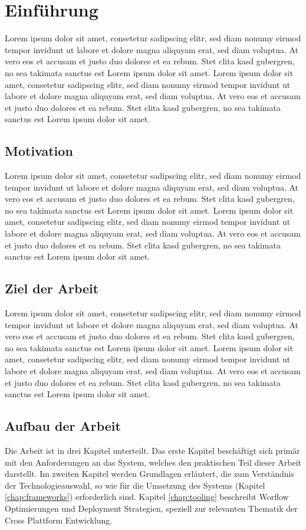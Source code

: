 
\chapter{Einführung}
\label{chap:introduction}

Lorem ipsum dolor sit amet, consetetur sadipscing elitr, sed diam nonumy eirmod
tempor invidunt ut labore et dolore magna aliquyam erat, sed diam voluptua.
At vero eos et accusam et justo duo dolores et ea rebum. Stet clita kasd gubergren,
no sea takimata sanctus est Lorem ipsum dolor sit amet. Lorem ipsum dolor sit amet,
consetetur sadipscing elitr, sed diam nonumy eirmod tempor invidunt ut
labore et dolore magna aliquyam erat, sed diam voluptua. At vero eos et accusam et
justo duo dolores et ea rebum. Stet clita kasd gubergren, no sea takimata sanctus est Lorem ipsum dolor sit amet.


\section{Motivation}

Lorem ipsum dolor sit amet, consetetur sadipscing elitr, sed diam nonumy eirmod
tempor invidunt ut labore et dolore magna aliquyam erat, sed diam voluptua.
At vero eos et accusam et justo duo dolores et ea rebum. Stet clita kasd gubergren,
no sea takimata sanctus est Lorem ipsum dolor sit amet. Lorem ipsum dolor sit amet,
consetetur sadipscing elitr, sed diam nonumy eirmod tempor invidunt ut labore et dolore magna aliquyam erat, sed diam voluptua. At vero eos et accusam et justo duo dolores et ea rebum. Stet clita kasd gubergren, no sea takimata sanctus est Lorem ipsum dolor sit amet.

\section{Ziel der Arbeit}
Lorem ipsum dolor sit amet, consetetur sadipscing elitr, sed diam nonumy eirmod
tempor invidunt ut labore et dolore magna aliquyam erat, sed diam voluptua. At vero eos et accusam et justo duo dolores et ea rebum. Stet clita kasd gubergren, no sea takimata sanctus est Lorem ipsum dolor sit amet. Lorem ipsum dolor sit amet, consetetur sadipscing elitr, sed diam nonumy eirmod tempor invidunt ut labore et dolore magna aliquyam erat, sed diam voluptua. At vero eos et accusam et justo duo dolores et ea rebum. Stet clita kasd gubergren, no sea takimata sanctus est Lorem ipsum dolor sit amet.

\section{Aufbau der Arbeit}
Die Arbeit ist in drei Kapitel unterteilt. Das erste Kapitel beschäftigt sich primär mit den
Anforderungen an das System, welches den praktischen Teil dieser Arbeit darstellt.
Im zweiten Kapitel werden Grundlagen erläutert, die zum Verständnis der Technologieauswahl,
so wie für die Umsetzung des Systems (Kapitel \ref{chap:frameworks}) erforderlich sind. Kapitel \ref{chap:tooling}
beschreibt Worflow Optimierungen und Deployment Strategien, speziell zur relevanten
Thematik der Cross Plattform Entwicklung.

